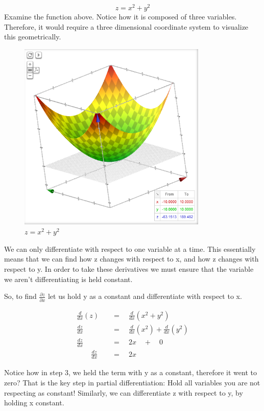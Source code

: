 \documentclass[12pt]{article}
\begin{document}
$$z = x^2 + y^2$$
Examine the function above. Notice how it is composed of three variables. Therefore, it would require a three dimensional coordinate system to visualize this geometrically. 

\begin{figure}[ht!]
\centering
\includegraphics[width=90mm]{images/image.png}
\caption{$z = x^2 + y^2$}
\label{overflow}
\end{figure}

We can only differentiate with respect to one variable at a time. This essentially means that we can find how z changes with respect to x, and how z changes with respect to y. In order to take these derivatives we must ensure that the variable we aren't differentiating is held constant.

So, to find $\frac { \partial z }{ \partial x } $ let us hold y as a constant and differentiate with respect to x.

\begin{align}
\frac { d }{ dx }(z)\quad&=\quad\frac { d }{ dx } ({ x }^{ 2 }+{ y }^{ 2 }) \\
\frac { dz }{ dx }\quad&=\quad\frac { d }{ dx } ({ x }^{ 2 })+\frac { d }{ dx } ({ y }^{ 2 }) \\
\frac { dz }{ dx }\quad&=\quad2x\quad +\quad0 \\
\quad \quad \frac { dz }{ dx }\quad&=\quad2x
\end{align}

Notice how in step 3, we held the term with y as a constant, therefore it went to zero? That is the key step in partial differentiation: Hold all variables you are not respecting as constant! Similarly, we can differentiate z with respect to y, by holding x constant.
\end{document}
